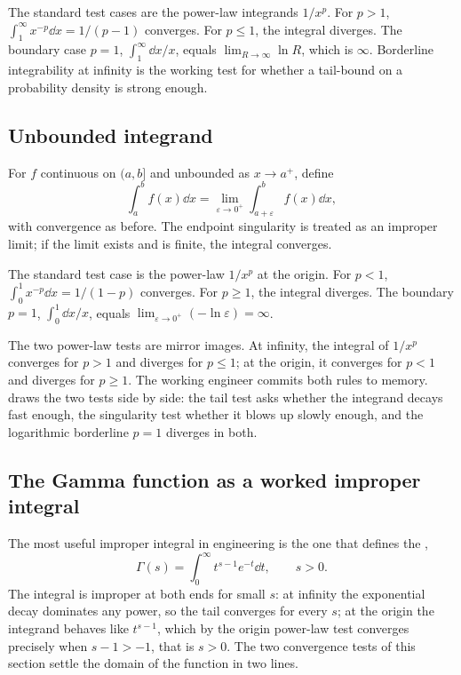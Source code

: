 The standard test cases are the power-law integrands $1/x^{p}$. For
$p > 1$, $\int_{1}^{\infty} x^{-p} \dd x = 1/(p-1)$ converges. For
$p \leq 1$, the integral diverges. The boundary case $p = 1$,
$\int_{1}^{\infty} \dd x / x$, equals $\lim_{R \to \infty} \ln R$,
which is $\infty$. Borderline integrability at infinity is the
working test for whether a tail-bound on a probability density is
strong enough.

\subsection{Unbounded integrand}

For $f$ continuous on $(a, b]$ and unbounded as $x \to a^{+}$,
define
\[
\int_{a}^{b} f(x) \dd x = \lim_{\varepsilon \to 0^{+}}
\int_{a + \varepsilon}^{b} f(x) \dd x,
\]
with convergence as before. The endpoint singularity is treated as
an improper limit; if the limit exists and is finite, the integral
converges.

The standard test case is the power-law $1/x^{p}$ at the origin.
For $p < 1$, $\int_{0}^{1} x^{-p} \dd x = 1/(1-p)$ converges. For
$p \geq 1$, the integral diverges. The boundary $p = 1$,
$\int_{0}^{1} \dd x / x$, equals $\lim_{\varepsilon \to 0^{+}}
(- \ln \varepsilon) = \infty$.

The two power-law tests are mirror images. At infinity, the integral
of $1/x^{p}$ converges for $p > 1$ and diverges for $p \leq 1$; at
the origin, it converges for $p < 1$ and diverges for $p \geq 1$.
The working engineer commits both rules to memory.
 draws the two tests side by
side: the tail test asks whether the integrand decays fast enough,
the singularity test whether it blows up slowly enough, and the
logarithmic borderline $p = 1$ diverges in both.



\subsection{The Gamma function as a worked improper integral}

The most useful improper integral in engineering is the one that
defines the ,
\[
\Gamma(s) = \int_{0}^{\infty} t^{s-1}e^{-t}\dd t, \qquad s > 0.
\]
The integral is improper at both ends for small $s$: at infinity the
exponential decay dominates any power, so the tail converges for
every $s$; at the origin the integrand behaves like $t^{s-1}$, which
by the origin power-law test converges precisely when $s - 1 > -1$,
that is $s > 0$. The two convergence tests of this section settle
the domain of the function in two lines.

